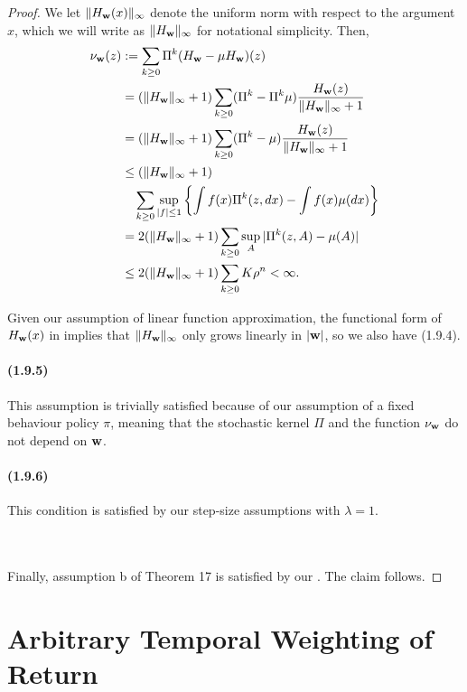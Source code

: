 \begin{appendices}
\begin{proof}
\noindent We let $\|H_{\mathbf{w}}(x)\|_\infty$ denote the uniform norm with respect to the argument $x$, which we will write as $\|H_{\mathbf{w}}\|_\infty$ for notational simplicity. Then,
\begin{align*}
    \nu_{\mathbf{w}}(z) &:= \sum_{k \geq 0} \Pi^k(H_{\mathbf{w}} - \mu H_{\mathbf{w}})(z)\\
    &= (\|H_{\mathbf{w}}\|_\infty + 1) \sum_{k \geq 0} (\Pi^k - \Pi^k \mu) \frac{H_{\mathbf{w}}(z)}{\|H_{\mathbf{w}}\|_\infty + 1}\\
    &= (\|H_{\mathbf{w}}\|_\infty + 1) \sum_{k \geq 0} (\Pi^k - \mu) \frac{H_{\mathbf{w}}(z)}{\|H_{\mathbf{w}}\|_\infty + 1}\\
    &\leq  (\|H_{\mathbf{w}}\|_\infty + 1) \\
        &\quad \sum_{k \geq 0}\sup_{|f| \leq 1} \left\{\int f(x) \Pi^k(z, dx) - \int f(x) \mu(dx)\right \}\\
    &= 2 (\|H_{\mathbf{w}}\|_\infty + 1) \sum_{k \geq 0} \sup_A |\Pi^k(z, A) - \mu(A)|\\
    &\leq  2 (\|H_{\mathbf{w}}\|_\infty + 1) \sum_{k \geq 0}  K \rho^n < \infty.
\end{align*}

\noindent Given our assumption of linear function approximation, the functional form of $H_{\mathbf{w}}(x)$ in  implies that $\|H_{\mathbf{w}}\|_\infty$ only grows linearly in $|\mathbf{w}|$, so we also have (1.9.4).

\paragraph{(1.9.5)}
This assumption is trivially satisfied because of our assumption of a fixed behaviour policy $\pi$, meaning that the stochastic kernel $\Pi$ and the function $\nu_{\mathbf{w}}$ do not depend on $\mathbf{w}$.

\paragraph{(1.9.6)}
This condition is satisfied by our step-size assumptions with $\lambda = 1$.


~\\~\\ Finally, assumption b of Theorem 17 is satisfied by our . The claim follows.
\end{proof}

\section{Arbitrary Temporal Weighting of Return}\label{appdx:arbitraryweights}


\end{appendices}
